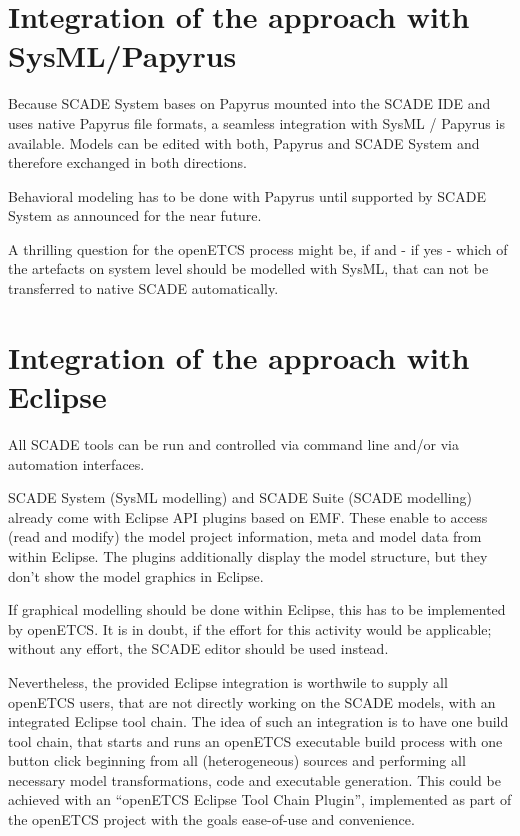 \section{Integration of the approach with SysML/Papyrus}

Because SCADE System bases on Papyrus mounted into the SCADE IDE and uses native Papyrus file formats, a seamless integration with SysML / Papyrus is available.
Models can be edited with both, Papyrus and SCADE System and therefore exchanged in both directions. 

Behavioral modeling has to be done with Papyrus until supported by SCADE System as announced for the near future. 

A thrilling question for the openETCS process might be, if and - if yes - which of the artefacts on system level should be modelled with SysML, that can not be transferred to native SCADE automatically. 


\section{Integration of the approach with Eclipse}

All SCADE tools can be run and controlled via command line and/or via automation interfaces. 

SCADE System (SysML modelling) and SCADE Suite (SCADE modelling) already come with Eclipse API plugins based on EMF. These enable to access (read and modify) the model project information, meta and model data from within Eclipse. 
The plugins additionally display the model structure, but they don't show the model graphics in Eclipse. 

If graphical modelling should be done within Eclipse, this has to be implemented by openETCS. It is in doubt, if the effort for this activity would be applicable; without any effort, the SCADE editor should be used instead. 
 
Nevertheless, the provided Eclipse integration is worthwile to supply all openETCS users, that are not directly working on the SCADE models, with an integrated Eclipse tool chain. 
The idea of such an integration is to have one build tool chain, that starts and runs an openETCS executable build process with one button click beginning from all (heterogeneous) sources and performing all necessary model transformations, code and executable generation. 
This could be achieved with an "`openETCS Eclipse Tool Chain Plugin"', implemented as part of the openETCS project with the goals ease-of-use and convenience. 

